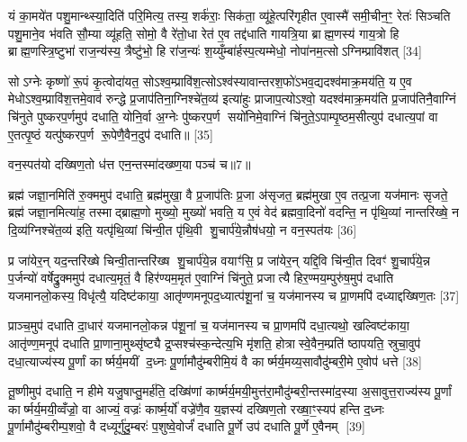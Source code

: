यं का॒मये॑त पशु॒मान्थ्स्या॒दिति॑ परि॒मित्य॒ तस्य॒ शर्क॑राः॒ सिक॑ता॒ व्यू॑हे॒त्परि॑गृहीत ए॒वास्मै॑ समी॒चीन॒ꣳ॒ रेतः॑ सिञ्चति पशु॒माने॒व भ॑वति सौ॒म्या व्यू॑हति॒ सोमो॒ वै रे॑तो॒धा रेत॑ ए॒व तद्द॑धाति गायत्रि॒या ब्राह्म॒णस्य॑ गाय॒त्रो हि ब्राह्म॒णस्त्रि॒ष्टुभा॑ राज॒न्य॑स्य॒ त्रैष्टु॑भो॒ हि रा॑ज॒न्यः॑ श॒य्युँम्बा॑र्\mbox{}हस्प॒त्यम्मेधो॒ नोपा॑नम॒त्सोऽग्निम्प्रावि॑शत् [34]

सोऽग्नेः कृष्णो॑ रू॒पं कृ॒त्वोदा॑यत॒ सोऽश्व॒म्प्रावि॑श॒त्सोऽश्व॑स्यावान्तरश॒फो॑ऽभव॒द्यदश्व॑माक्र॒मय॑ति॒ य ए॒व मेधोऽश्व॒म्प्रावि॑श॒त्तमे॒वाव॑ रुन्द्धे प्र॒जाप॑तिना॒ग्निश्चे॑त॒व्य॑ इत्या॑हुः प्राजाप॒त्योऽश्वो॒ यदश्व॑माक्र॒मय॑ति प्र॒जाप॑तिनै॒वाग्निं चि॑नुते पुष्करप॒र्णमुप॑ दधाति॒ योनि॒र्वा अ॒ग्नेः पु॑ष्करप॒र्ण सयो॑निमे॒वाग्निं चि॑नुते॒ऽपाम्पृ॒ष्ठम॒सीत्युप॑ दधात्य॒पां वा ए॒तत्पृ॒ष्ठं यत्पु॑ष्करप॒र्ण रू॒पेणै॒वैन॒दुप॑ दधाति॥ [35]

{\scriptsize {वन॒स्पत॑यो दख्षिण॒तो ध॑त्त एन॒न्तस्मा॑दख्ष्ण॒या पञ्च॑ च॥7॥}}

ब्रह्म॑ जज्ञा॒नमिति॑ रु॒क्ममुप॑ दधाति॒ ब्रह्म॑मुखा॒ वै प्र॒जाप॑तिः प्र॒जा अ॑सृजत॒ ब्रह्म॑मुखा ए॒व तत्प्र॒जा यज॑मानः सृजते॒ ब्रह्म॑ जज्ञा॒नमित्या॑ह॒ तस्माद्ब्राह्म॒णो मुख्यो॒ मुख्यो॑ भवति॒ य ए॒वं वेद॑ ब्रह्मवा॒दिनो॑ वदन्ति॒ न पृ॑थि॒व्यां नान्तरि॑ख्षे॒ न दि॒व्य॑ग्निश्चे॑त॒व्य॑ इति॒ यत्पृ॑थि॒व्यां चि॑न्वी॒त पृ॑थि॒वी शु॒चार्प॑ये॒न्नौष॑धयो॒ न वन॒स्पत॑यः [36]

प्र जा॑येर॒न् यद॒न्तरि॑ख्षे चिन्वी॒तान्तरि॑ख्ष शु॒चार्प॑ये॒न्न वयाꣳ॑सि॒ प्र जा॑येर॒न् यद्दि॒वि चि॑न्वी॒त दिवꣳ॑ शु॒चार्प॑ये॒न्न प॒र्जन्यो॑ वर्\mbox{}षेद्रु॒क्ममुप॑ दधात्य॒मृतं॒ वै हिर॑ण्यम॒मृत॑ ए॒वाग्निं चि॑नुते॒ प्रजात्यै हिर॒ण्मय॒म्पुरु॑ष॒मुप॑ दधाति यजमानलो॒कस्य॒ विधृ॑त्यै॒ यदिष्ट॑काया॒ आतृ॑ण्णमनूपद॒ध्यात्प॑शू॒नां च॒ यज॑मानस्य च प्रा॒णमपि॑ दध्याद्दख्षिण॒तः [37]

प्राञ्च॒मुप॑ दधाति दा॒धार॑ यजमानलो॒कन्न प॑शू॒नां च॒ यज॑मानस्य च प्रा॒णमपि॑ दधा॒त्यथो॒ खल्विष्ट॑काया॒ आतृ॑ण्ण॒मनूप॑ दधाति प्रा॒णाना॒मुथ्सृ॑ष्ट्यै द्र॒प्सश्च॑स्क॒न्देत्य॒भि मृ॑शति॒ होत्रास्वे॒वैन॒म्प्रति॑ ष्ठापयति॒ स्रुचा॒वुप॑ दधा॒त्याज्य॑स्य पू॒र्णां कार्ष्मर्य॒मयीं द॒ध्नः पू॒र्णामौदु॑म्बरीमि॒यं वै कार्ष्मर्य॒मय्य॒सावौदु॑म्बरी॒मे ए॒वोप॑ धत्ते [38]

तू॒ष्णीमुप॑ दधाति॒ न हीमे यजु॒षाप्तु॒मर्\mbox{}ह॑ति॒ दख्षि॑णां कार्ष्मर्य॒मयी॒मुत्त॑रा॒मौदु॑म्बरी॒न्तस्मा॑द॒स्या अ॒सावुत्त॒राज्य॑स्य पू॒र्णां कार्ष्मर्य॒मयी॒व्वँज्रो॒ वा आज्यं॒ वज्रः॑ कार्ष्म॒र्यो॑ वज्रे॑णै॒व य॒ज्ञस्य॑ दख्षिण॒तो रख्षा॒ꣳ॒स्यप॑ हन्ति द॒ध्नः पू॒र्णामौदु॑म्बरीम्प॒शवो॒ वै दध्यूर्गु॑दु॒म्बरः॑ प॒शुष्वे॒वोर्जं॑ दधाति पू॒र्णे उप॑ दधाति पू॒र्णे ए॒वैनम् [39]

